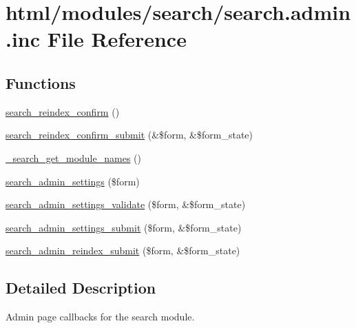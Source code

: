 \hypertarget{search_8admin_8inc}{
\section{html/modules/search/search.admin.inc File Reference}
\label{search_8admin_8inc}
}
\subsection*{Functions}
\begin{DoxyCompactItemize}
\item 
\hyperlink{search_8admin_8inc_ae9ae9613e345b5d8c1cec29acaa64045}{search\_\-reindex\_\-confirm} ()
\item 
\hyperlink{search_8admin_8inc_a608741a65307f9cedde7c77ce05f8a45}{search\_\-reindex\_\-confirm\_\-submit} (\&\$form, \&\$form\_\-state)
\item 
\hyperlink{search_8admin_8inc_af1d9d6ecf1417767a171324886297b96}{\_\-search\_\-get\_\-module\_\-names} ()
\item 
\hyperlink{group__forms_gaa2b01af13156640d290f3a3c6042bd3a}{search\_\-admin\_\-settings} (\$form)
\item 
\hyperlink{search_8admin_8inc_ac02dbfc93e16ceefc020a119da393584}{search\_\-admin\_\-settings\_\-validate} (\$form, \&\$form\_\-state)
\item 
\hyperlink{search_8admin_8inc_a805559246fe20818784c24c1f95dbaf9}{search\_\-admin\_\-settings\_\-submit} (\$form, \&\$form\_\-state)
\item 
\hyperlink{search_8admin_8inc_af58628d37095963f5e991d357535e957}{search\_\-admin\_\-reindex\_\-submit} (\$form, \&\$form\_\-state)
\end{DoxyCompactItemize}


\subsection{Detailed Description}
Admin page callbacks for the search module. 

